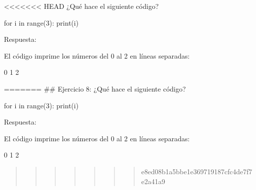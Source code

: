 \documentclass[
  a4paper,
  onepage,
  openany]{scrreprt}
\newenvironment{Shaded}{\begin{snugshade}}{\end{snugshade}}
\newcommand{\BuiltInTok}[1]{\textcolor[rgb]{0.00,0.23,0.31}{#1}}
\newcommand{\ControlFlowTok}[1]{\textcolor[rgb]{0.00,0.23,0.31}{#1}}
\newcommand{\DecValTok}[1]{\textcolor[rgb]{0.68,0.00,0.00}{#1}}
\newcommand{\ExtensionTok}[1]{\textcolor[rgb]{0.00,0.23,0.31}{#1}}
\newcommand{\KeywordTok}[1]{\textcolor[rgb]{0.00,0.23,0.31}{#1}}
\newcommand{\NormalTok}[1]{\textcolor[rgb]{0.00,0.23,0.31}{#1}}
\begin{document}
\textless\textless\textless\textless\textless\textless\textless{} HEAD
¿Qué hace el siguiente código?

\begin{Shaded}
\begin{Highlighting}[]
\ControlFlowTok{for}\NormalTok{ i }\KeywordTok{in} \BuiltInTok{range}\NormalTok{(}\DecValTok{3}\NormalTok{):}
    \BuiltInTok{print}\NormalTok{(i)}
\end{Highlighting}
\end{Shaded}

Respuesta:

El código imprime los números del 0 al 2 en líneas separadas:

\begin{Shaded}
\begin{Highlighting}[]
\ExtensionTok{0}
\ExtensionTok{1}
\ExtensionTok{2}
\end{Highlighting}
\end{Shaded}

======= \#\# Ejercicio 8: ¿Qué hace el siguiente código?

\begin{Shaded}
\begin{Highlighting}[]
\ControlFlowTok{for}\NormalTok{ i }\KeywordTok{in} \BuiltInTok{range}\NormalTok{(}\DecValTok{3}\NormalTok{):}
    \BuiltInTok{print}\NormalTok{(i)}
\end{Highlighting}
\end{Shaded}

Respuesta:

El código imprime los números del 0 al 2 en líneas separadas:

\begin{Shaded}
\begin{Highlighting}[]
\ExtensionTok{0}
\ExtensionTok{1}
\ExtensionTok{2}
\end{Highlighting}
\end{Shaded}

\begin{quote}
\begin{quote}
\begin{quote}
\begin{quote}
\begin{quote}
\begin{quote}
\begin{quote}
e8ed08b1a5bbe1e369719187cfc4de7f7e2a41a9
\end{quote}
\end{quote}
\end{quote}
\end{quote}
\end{quote}
\end{quote}
\end{quote}
\end{document}
